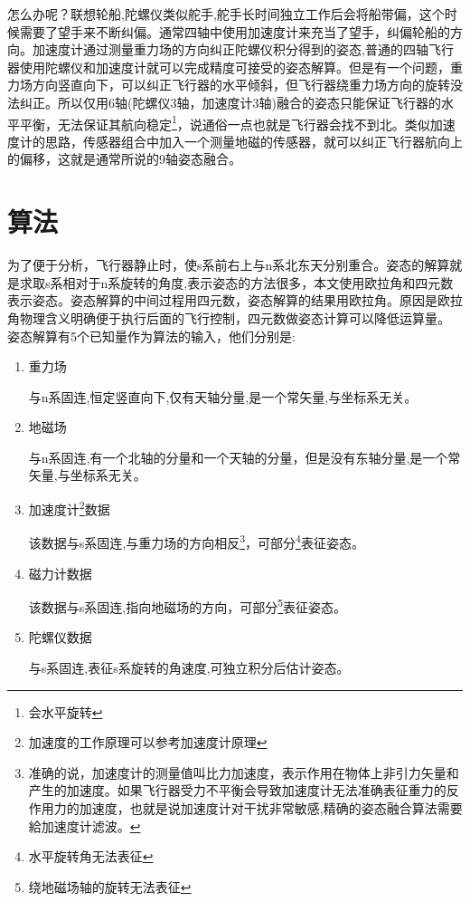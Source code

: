 \documentclass[12pt,a4paper]{article}
\renewcommand{\citep}[1]{\textsuperscript{\cite{#1}}}
\begin{document}
怎么办呢？\citep{9轴融合论文}联想轮船,陀螺仪类似舵手,舵手长时间独立工作后会将船带偏，这个时候需要了望手来不断纠偏。通常四轴中使用加速度计来充当了望手，纠偏轮船的方向。加速度计通过测量重力场的方向纠正陀螺仪积分得到的姿态,普通的四轴飞行器使用陀螺仪和加速度计就可以完成精度可接受的姿态解算。但是有一个问题，重力场方向竖直向下，可以纠正飞行器的水平倾斜，但飞行器绕重力场方向的旋转没法纠正。所以仅用6轴(陀螺仪3轴，加速度计3轴)融合的姿态只能保证飞行器的水平平衡，无法保证其航向稳定\footnote{会水平旋转}，说通俗一点也就是飞行器会找不到北。类似加速度计的思路，传感器组合中加入一个测量地磁的传感器\citep{经典博客}，就可以纠正飞行器航向上的偏移，这就是通常所说的9轴姿态融合。

\section{算法}
为了便于分析，飞行器静止时，使s系前右上与n系北东天分别重合。姿态的解算就是求取s系相对于n系旋转的角度,表示姿态的方法很多，本文使用欧拉角和四元数表示姿态。姿态解算的中间过程用四元数，姿态解算的结果用欧拉角。原因是欧拉角物理含义明确便于执行后面的飞行控制，四元数做姿态计算可以降低运算量。
姿态解算有5个已知量作为算法的输入，他们分别是:
\begin{enumerate}
    \item 重力场

        与n系固连,恒定竖直向下,仅有天轴分量,是一个常矢量,与坐标系无关。
    \item 地磁场

        与n系固连,有一个北轴的分量和一个天轴的分量，但是没有东轴分量,是一个常矢量,与坐标系无关。
    \item 加速度计\footnote{加速度的工作原理可以参考加速度计原理\citep{加速度计原理}}数据

        该数据与s系固连,与重力场的方向相反\footnote{准确的说，加速度计的测量值叫比力加速度，表示作用在物体上非引力矢量和产生的加速度。如果飞行器受力不平衡会导致加速度计无法准确表征重力的反作用力的加速度，也就是说加速度计对干扰非常敏感,精确的姿态融合算法需要給加速度计滤波。}，可部分\footnote{水平旋转角无法表征}表征姿态。
    \item 磁力计数据

        该数据与s系固连,指向地磁场的方向，可部分\footnote{绕地磁场轴的旋转无法表征}表征姿态。
    \item 陀螺仪数据

        与s系固连,表征s系旋转的角速度,可独立积分后估计姿态。
\end{enumerate}
\end{document}
